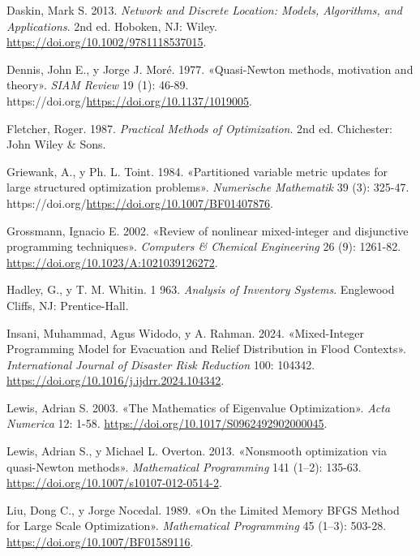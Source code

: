\documentclass[
  spanish,
  us-letterpaper,
  DIV=11,
  numbers=noendperiod]{scrreprt}
\newlength{\cslhangindent}
\newenvironment{CSLReferences}[2] %
 {\begin{list}{}{%
  \setlength{\itemindent}{0pt}
  \setlength{\leftmargin}{0pt}
  \setlength{\parsep}{0pt}
  \ifodd #1
   \setlength{\leftmargin}{\cslhangindent}
   \setlength{\itemindent}{-1\cslhangindent}
  \fi
  \setlength{\itemsep}{#2\baselineskip}}}
 {\end{list}}
\numberwithin{equation}{section}
\begin{document}
\begin{CSLReferences}{1}{0}
Daskin, Mark S. 2013. \emph{Network and Discrete Location: Models,
Algorithms, and Applications}. 2nd ed. Hoboken, NJ: Wiley.
\url{https://doi.org/10.1002/9781118537015}.

Dennis, John E., y Jorge J. Moré. 1977. {«Quasi-{N}ewton methods,
motivation and theory»}. \emph{SIAM Review} 19 (1): 46-89.
https://doi.org/\url{https://doi.org/10.1137/1019005}.

Fletcher, Roger. 1987. \emph{Practical Methods of Optimization}. 2nd ed.
Chichester: John Wiley \& Sons.

Griewank, A., y Ph. L. Toint. 1984. {«Partitioned variable metric
updates for large structured optimization problems»}. \emph{Numerische
Mathematik} 39 (3): 325-47.
https://doi.org/\url{https://doi.org/10.1007/BF01407876}.

Grossmann, Ignacio E. 2002. {«Review of nonlinear mixed-integer and
disjunctive programming techniques»}. \emph{Computers \& Chemical
Engineering} 26 (9): 1261-82.
\url{https://doi.org/10.1023/A:1021039126272}.

Hadley, G., y T. M. Whitin. 1 963. \emph{Analysis of Inventory Systems}.
Englewood Cliffs, NJ: Prentice-Hall.

Insani, Muhammad, Agus Widodo, y A. Rahman. 2024. {«Mixed-Integer
Programming Model for Evacuation and Relief Distribution in Flood
Contexts»}. \emph{International Journal of Disaster Risk Reduction} 100:
104342. \url{https://doi.org/10.1016/j.ijdrr.2024.104342}.

Lewis, Adrian S. 2003. {«The Mathematics of Eigenvalue Optimization»}.
\emph{Acta Numerica} 12: 1-58.
\url{https://doi.org/10.1017/S0962492902000045}.

Lewis, Adrian S., y Michael L. Overton. 2013. {«Nonsmooth optimization
via quasi-Newton methods»}. \emph{Mathematical Programming} 141 (1--2):
135-63. \url{https://doi.org/10.1007/s10107-012-0514-2}.

Liu, Dong C., y Jorge Nocedal. 1989. {«On the Limited Memory BFGS Method
for Large Scale Optimization»}. \emph{Mathematical Programming} 45
(1--3): 503-28. \url{https://doi.org/10.1007/BF01589116}.


\end{CSLReferences}
\end{document}
